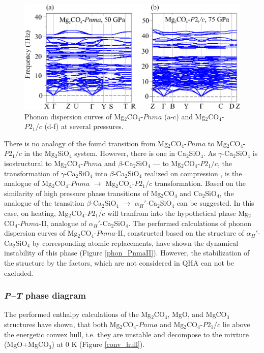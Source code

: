 \documentclass[a4paperm]{article}
\begin{document}
\begin{figure}[H]
	\includegraphics[width=\textwidth]{phon_mg} \centering
	\caption{Phonon dispersion curves of Mg$_2$CO$_4$-$Pnma$ (a-c) and Mg$_2$CO$_4$-$P2_1/c$ (d-f) at several pressures.
	} 	\label{phon_mg2co4_main}
\end{figure}



There is no analogy of the found transition from Mg$_2$CO$_4$-$Pnma$ to Mg$_2$CO$_4$-$P2_1/c$ in the Mg$_2$SiO$_4$ system.
However, there is one in Ca$_2$SiO$_4$.
As $\gamma$-Ca$_2$SiO$_4$ is isostructural to Mg$_2$CO$_4$-$Pnma$ and $\beta$-Ca$_2$SiO$_4$ --- to Mg$_2$CO$_4$-$P2_1/c$, the transformation of $\gamma$-Ca$_2$SiO$_4$ into $\beta$-Ca$_2$SiO$_4$ realized on compression \cite{belmonte2017}, is the analogue of Mg$_2$CO$_4$-$Pnma$ $\to$ Mg$_2$CO$_4$-$P2_1/c$ transformation. 
Based on the similarity of high pressure phase transitions of Mg$_2$CO$_4$ and Ca$_2$SiO$_4$, the analogue of the transition $\beta$-Ca$_2$SiO$_4$ $\to$ $\alpha_H'$-Ca$_2$SiO$_4$ can be suggested.
In this case, on heating, Mg$_2$CO$_4$-$P2_1/c$ will tranfrom into the hypothetical phase Mg$_2$CO$_4$-$Pnma$-II, analogue of $\alpha_H'$-Ca$_2$SiO$_4$.
The performed calculations of phonon dispersion curves of Mg$_2$CO$_4$-$Pnma$-II, constructed based on the structure of $\alpha_H'$-Ca$_2$SiO$_4$ by corresponding atomic replacements, have shown the dynamical instability of this phase (Figure \ref{phon_PnmaII}).
However, the stabilization of the structure by the factors, which are not considered in QHA can not be excluded.




\subsubsection*{{\it P--T} phase diagram}

The performed enthalpy calculations of the Mg$_2$CO$_4$, MgO, and MgCO$_3$ structures have shown, that both Mg$_2$CO$_4$-$Pnma$ and Mg$_2$CO$_4$-$P2_1/c$ lie above the energetic convex hull, i.e. they are unstable and decompose to the mixture (MgO+MgCO$_3$) at 0 K (Figure \ref{conv_hull}).
\end{document}
